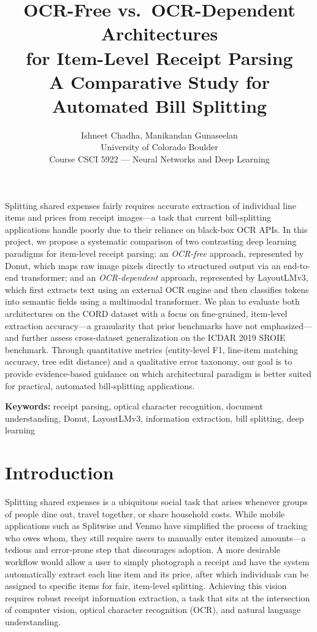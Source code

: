 \documentclass[9pt,twocolumn,twoside]{extarticle}
\title{%
  \vspace{-2em}%
  \textbf{\large OCR-Free vs.\ OCR-Dependent Architectures\\[2pt]
  for Item-Level Receipt Parsing}\\[4pt]
  {\small A Comparative Study for Automated Bill Splitting}%
  \vspace{-0.5em}%
}
\author{%
  Ishneet Chadha, Manikandan Gunaseelan\\[2pt]
  {\small University of Colorado Boulder}\\
  {\small Course CSCI 5922 --- Neural Networks and Deep Learning}\\[2pt]
}
\date{}
\begin{document}
\maketitle
\thispagestyle{plain}
\renewcommand\linenumberfont{\normalfont\scriptsize\color{gray}}
\linenumbers

\leftlinenumbers
\begin{onecolabstract}
Splitting shared expenses fairly requires accurate extraction of individual line items and prices from receipt images---a task that current bill-splitting applications handle poorly due to their reliance on black-box OCR APIs. In this project, we propose a systematic comparison of two contrasting deep learning paradigms for item-level receipt parsing: an \emph{OCR-free} approach, represented by Donut, which maps raw image pixels directly to structured output via an end-to-end transformer; and an \emph{OCR-dependent} approach, represented by LayoutLMv3, which first extracts text using an external OCR engine and then classifies tokens into semantic fields using a multimodal transformer. We plan to evaluate both architectures on the CORD dataset with a focus on fine-grained, item-level extraction accuracy---a granularity that prior benchmarks have not emphasized---and further assess cross-dataset generalization on the ICDAR 2019 SROIE benchmark. Through quantitative metrics (entity-level F1, line-item matching accuracy, tree edit distance) and a qualitative error taxonomy, our goal is to provide evidence-based guidance on which architectural paradigm is better suited for practical, automated bill-splitting applications.
\end{onecolabstract}
\switchlinenumbers

\smallskip
\noindent\textbf{Keywords:} receipt parsing, optical character recognition, document understanding, Donut, LayoutLMv3, information extraction, bill splitting, deep learning
\medskip

\section{Introduction}
\label{sec:intro}

Splitting shared expenses is a ubiquitous social task that arises whenever groups of people dine out, travel together, or share household costs. While mobile applications such as Splitwise and Venmo have simplified the process of tracking who owes whom, they still require users to manually enter itemized amounts---a tedious and error-prone step that discourages adoption. A more desirable workflow would allow a user to simply photograph a receipt and have the system automatically extract each line item and its price, after which individuals can be assigned to specific items for fair, item-level splitting. Achieving this vision requires robust receipt information extraction, a task that sits at the intersection of computer vision, optical character recognition (OCR), and natural language understanding.
\end{document}
